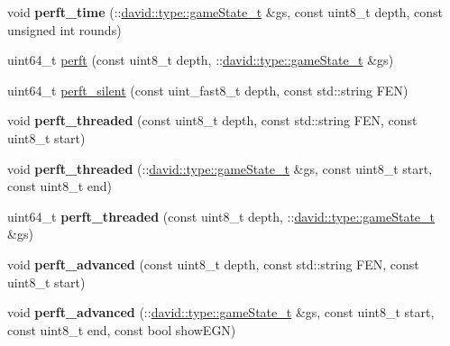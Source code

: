 \begin{DoxyCompactItemize}
\item 
\mbox{\label{namespaceutils_ae1bb226cc994b62a8f03b69775466ef4}} 
void {\bfseries perft\+\_\+time} (\+::\hyperlink{structdavid_1_1bitboard_1_1gameState}{david\+::type\+::game\+State\+\_\+t} \&gs, const uint8\+\_\+t depth, const unsigned int rounds)
\item 
uint64\+\_\+t \hyperlink{namespaceutils_adb012fdcadbd0fefac13b72dcb638f9d}{perft} (const uint8\+\_\+t depth, \+::\hyperlink{structdavid_1_1bitboard_1_1gameState}{david\+::type\+::game\+State\+\_\+t} \&gs)
\item 
uint64\+\_\+t \hyperlink{namespaceutils_abcc8166e9f81cb4000d77b797f0d4c38}{perft\+\_\+silent} (const uint\+\_\+fast8\+\_\+t depth, const std\+::string F\+EN)
\item 
\mbox{\label{namespaceutils_ac2e1f395d95ba5fdacc69b4e320ed740}} 
void {\bfseries perft\+\_\+threaded} (const uint8\+\_\+t depth, const std\+::string F\+EN, const uint8\+\_\+t start)
\item 
\mbox{\label{namespaceutils_ab7f80b12546ca2f17d002e605653467c}} 
void {\bfseries perft\+\_\+threaded} (\+::\hyperlink{structdavid_1_1bitboard_1_1gameState}{david\+::type\+::game\+State\+\_\+t} \&gs, const uint8\+\_\+t start, const uint8\+\_\+t end)
\item 
\mbox{\label{namespaceutils_a71bc167bf8d687cfcd3cf83c97b17d92}} 
uint64\+\_\+t {\bfseries perft\+\_\+threaded} (const uint8\+\_\+t depth, \+::\hyperlink{structdavid_1_1bitboard_1_1gameState}{david\+::type\+::game\+State\+\_\+t} \&gs)
\item 
\mbox{\label{namespaceutils_abbe567db351c5a00ba036b6209e9fee1}} 
void {\bfseries perft\+\_\+advanced} (const uint8\+\_\+t depth, const std\+::string F\+EN, const uint8\+\_\+t start)
\item 
\mbox{\label{namespaceutils_a82bc2fa3b6d0dd57867d9fe008c9280e}} 
void {\bfseries perft\+\_\+advanced} (\+::\hyperlink{structdavid_1_1bitboard_1_1gameState}{david\+::type\+::game\+State\+\_\+t} \&gs, const uint8\+\_\+t start, const uint8\+\_\+t end, const bool show\+E\+GN)
\item 
\mbox{\label{namespaceutils_a0849c5193ffd2d6505fda2315b0565b3}} 

\end{DoxyCompactItemize}
